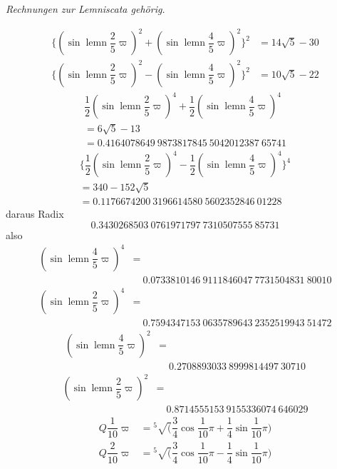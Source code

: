 \begin{center}\textit{Rechnungen zur Lemniscata gehörig.}\end{center}
\[
\begin{aligned}
\{(\sin\operatorname{lemn}\dfrac25\varpi)^2
+(\sin\operatorname{lemn}\dfrac45\varpi)^2\}^2&=14\surd5-30\\[5pt]
\{(\sin\operatorname{lemn}\dfrac25\varpi)^2
-(\sin\operatorname{lemn}\dfrac45\varpi)^2\}^2&=10\surd5-22
\end{aligned}
\]
\[
\begin{gathered}
\dfrac12(\sin\operatorname{lemn}\dfrac25\varpi)^4
+\dfrac12(\sin\operatorname{lemn}\dfrac45\varpi)^4
\\[5pt]=6\surd5-13\\[5pt]
=0.4164078649\ 9873817845\ 5042012387\ 65741
\end{gathered}
\]
\[
\begin{gathered}
\{\dfrac12(\sin\operatorname{lemn}\dfrac25\varpi)^4
-\dfrac12(\sin\operatorname{lemn}\dfrac45\varpi)^4\}^4
\\[5pt]=340-152\surd5\\[5pt]
=0.1176674200\ 3196614580\ 5602352846\ 01228
\end{gathered}
\]
\noindent daraus Radix
\[
0.3430268503\ 0761971797\ 7310507555\ 85731
\]
\noindent also
\[
\begin{aligned}(\sin\operatorname{lemn}\dfrac45\varpi)^4
&=\\[5pt]&\quad{}0.0733810146\ 9111846047\ 7731504831\ 80010\end{aligned}
\]
\[
\begin{aligned}(\sin\operatorname{lemn}\dfrac25\varpi)^4
&=\\[5pt]&\quad{}0.7594347153\ 0635789643\ 2352519943\ 51472\end{aligned}
\]
\[
\begin{aligned}(\sin\operatorname{lemn}\dfrac45\varpi)^2
&=\\[5pt]&\quad{}0.2708893033\ 8999814497\ 30710\end{aligned}
\]
\[
\begin{aligned}(\sin\operatorname{lemn}\dfrac25\varpi)^2
&=\\[5pt]&\quad{}0.8714555153\ 9155336074\ 646029\end{aligned}
\]
\[
\begin{aligned}
Q\dfrac1{10}\varpi
&={}^{5}\!\surd(\dfrac34\cos\dfrac1{10}\pi+\dfrac14\sin\dfrac1{10}\pi)\\[5pt]
Q\dfrac2{10}\varpi
&={}^{5}\!\surd(\dfrac34\cos\dfrac1{10}\pi-\dfrac14\sin\dfrac1{10}\pi)
\end{aligned}
\]
